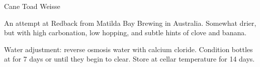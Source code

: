 \begin{recipe}{Cane Toad Weisse}

\begin{aboutblock}
An attempt at Redback from Matilda Bay Brewing in Australia. Somewhat drier,
but with high carbonation, low hopping, and subtle hints of clove and banana.
\end{aboutblock}


\begin{methodandtiming}
 
\begin{mashsteps}
\end{mashsteps}

\begin{fermentationsteps}
\end{fermentationsteps}

\begin{directions}
Water adjustment: reverse osmosis water with  calcium cloride.
Condition bottles at  for 7 days or until they begin to clear. Store
at cellar temperature for 14 days.
\end{directions}

\end{methodandtiming}

\recipebreak

\begin{ingredientsblock}
    
\begin{malts}
\end{malts}

\begin{hops}
\end{hops}


\end{ingredientsblock}

\end{recipe}


